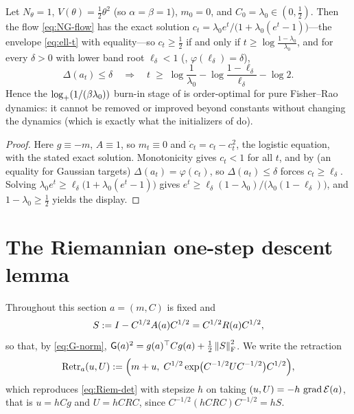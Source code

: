 \begin{proposition}
\label{prop:burnin-optimal}
Let $N_\theta=1$, $V(\theta)=\tfrac12\theta^2$ (so $\alpha=\beta=1$), $m_0=0$, and
$C_0=\lambda_0\in(0,\tfrac12)$. Then the flow \eqref{eq:NG-flow} has the exact solution
$c_t=\lambda_0e^t/\bigl(1+\lambda_0(e^t-1)\bigr)$---the envelope \eqref{eq:ell-t} with equality---so
$c_t\geq\tfrac12$ if and only if $t\geq\log\tfrac{1-\lambda_0}{\lambda_0}$, and for every $\delta>0$
with lower band root $\ell_\delta<1$ (, $\varphi(\ell_\delta)=\delta$),
\[
    \Delta(a_t)\leq\delta
    \quad\Longrightarrow\quad
    t\;\geq\;\log\frac1{\lambda_0}-\log\frac{1-\ell_\delta}{\ell_\delta}-\log2 .
\]
Hence the $\log_+(1/(\beta\lambda_0))$ burn-in stage of  is order-optimal for
pure Fisher--Rao dynamics: it cannot be removed or improved beyond constants without changing the
dynamics (which is exactly what the initializers of  do).
\end{proposition}

\begin{proof}
Here $g\equiv-m$, $A\equiv1$, so $m_t\equiv0$ and $\dot c_t=c_t-c_t^2$, the logistic equation, with
the stated exact solution. Monotonicity gives $c_t<1$ for all $t$, and by
 (an equality for Gaussian targets) $\Delta(a_t)=\varphi(c_t)$, so
$\Delta(a_t)\leq\delta$ forces $c_t\geq\ell_\delta$. Solving
$\lambda_0e^t\geq\ell_\delta\bigl(1+\lambda_0(e^t-1)\bigr)$ gives
$e^t\geq\ell_\delta(1-\lambda_0)/\bigl(\lambda_0(1-\ell_\delta)\bigr)$, and $1-\lambda_0\geq\tfrac12$
yields the display.
\end{proof}

\section{The Riemannian one-step descent lemma}
\label{sec:descent}

Throughout this section $a=(m,C)$ is fixed and
\begin{equation}
\label{eq:S-def}
    S:=I-C^{1/2}A(a)C^{1/2}=C^{1/2}R(a)C^{1/2},
\end{equation}
so that, by \eqref{eq:G-norm}, $\mathsf{G}(a)^2=g(a)^\top Cg(a)+\tfrac12\left\lVert S\right\rVert_{\mathrm{F}}^2$. We write
the retraction
\begin{equation}
\label{eq:retraction}
    \operatorname{Retr}_a(u,U):=\Bigl(m+u,\;C^{1/2}\exp\bigl(C^{-1/2}UC^{-1/2}\bigr)C^{1/2}\Bigr),
\end{equation}
which reproduces \eqref{eq:Riem-det} with stepsize $h$ on taking
$(u,U)=-h\,\operatorname{grad}\mathcal{E}(a)$, that is $u=hCg$ and $U=hCRC$,
since $C^{-1/2}(hCRC)C^{-1/2}=hS$.

